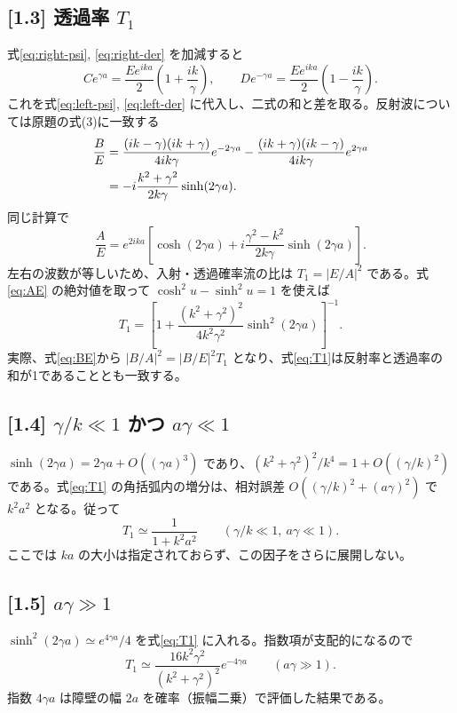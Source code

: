 \documentclass[11pt,a4paper]{article}
\begin{document}
\subsection*{[1.3] 透過率 $T_1$}
式\eqref{eq:right-psi}, \eqref{eq:right-der} を加減すると
\[
 Ce^{\gamma a}=\frac{E e^{ika}}2\left(1+\frac{ik}{\gamma}\right),\qquad
 De^{-\gamma a}=\frac{E e^{ika}}2\left(1-\frac{ik}{\gamma}\right).
\]
これを式\eqref{eq:left-psi}, \eqref{eq:left-der} に代入し、二式の和と差を取る。反射波については原題の式(3)に一致する
\begin{align}
 \frac BE&=\frac{(ik-\gamma)(ik+\gamma)}{4ik\gamma}e^{-2\gamma a}
 -\frac{(ik+\gamma)(ik-\gamma)}{4ik\gamma}e^{2\gamma a}\notag\\
 &=-i\frac{k^2+\gamma^2}{2k\gamma}\sinh(2\gamma a).\label{eq:BE}
\end{align}
同じ計算で
\begin{equation}
 \frac AE=e^{2ika}\left[\cosh(2\gamma a)
 +i\frac{\gamma^2-k^2}{2k\gamma}\sinh(2\gamma a)\right].\label{eq:AE}
\end{equation}
左右の波数が等しいため、入射・透過確率流の比は $T_1=|E/A|^2$ である。式\eqref{eq:AE} の絶対値を取って $\cosh^2u-\sinh^2u=1$ を使えば
\begin{equation}
 \boxed{T_1=\left[1+\frac{(k^2+\gamma^2)^2}{4k^2\gamma^2}\sinh^2(2\gamma a)\right]^{-1}}.\label{eq:T1}
\end{equation}
実際、式\eqref{eq:BE}から $|B/A|^2=|B/E|^2T_1$ となり、式\eqref{eq:T1}は反射率と透過率の和が1であることとも一致する。

\subsection*{[1.4] $\gamma/k\ll1$ かつ $a\gamma\ll1$}
$\sinh(2\gamma a)=2\gamma a+O((\gamma a)^3)$ であり、$(k^2+\gamma^2)^2/k^4=1+O((\gamma/k)^2)$ である。式\eqref{eq:T1} の角括弧内の増分は、相対誤差 $O((\gamma/k)^2+(a\gamma)^2)$ で $k^2a^2$ となる。従って
\[
 \boxed{T_1\simeq\frac{1}{1+k^2a^2}}\qquad(\gamma/k\ll1,\ a\gamma\ll1).
\]
ここでは $ka$ の大小は指定されておらず、この因子をさらに展開しない。

\subsection*{[1.5] $a\gamma\gg1$}
$\sinh^2(2\gamma a)\simeq e^{4\gamma a}/4$ を式\eqref{eq:T1} に入れる。指数項が支配的になるので
\[
 \boxed{T_1\simeq\frac{16k^2\gamma^2}{(k^2+\gamma^2)^2}e^{-4\gamma a}}\qquad(a\gamma\gg1).
\]
指数 $4\gamma a$ は障壁の幅 $2a$ を確率（振幅二乗）で評価した結果である。
\end{document}
